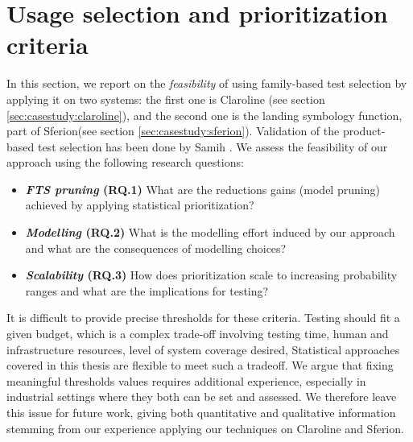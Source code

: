 %


\section{Usage selection and prioritization criteria}

\label{sec:experiment:usage}

In this section,  we report on the \emph{feasibility} of using family-based test selection \cite{Devroey2014,Devroey2015a} by applying it on two systems: the first one is Claroline (see section \ref{sec:casestudy:claroline}), and the second one is the landing symbology function, part of Sferion\texttrademark (see section \ref{sec:casestudy:sferion}). Validation of the product-based test selection has been done by Samih \etal \cite{Samih2014}.
%
We assess the feasibility of our approach using the following research questions:
\begin{itemize}
\item \textbf{\textit{FTS pruning} (RQ.1) } What are the reductions gains (model pruning) achieved by applying statistical  prioritization?    
\item \textbf{\textit{Modelling} (RQ.2) } What is the modelling effort induced by our approach and what are the consequences of modelling choices?
\item \textbf{\textit{Scalability} (RQ.3) } How does prioritization scale to increasing probability ranges and what are the implications for testing?  
\end{itemize}

It is difficult to provide precise thresholds for these criteria. Testing should fit a given budget, which is a complex trade-off involving testing time, human and infrastructure resources, level of system coverage desired, \etc  Statistical approaches covered in this thesis are  flexible to meet such a tradeoff. We argue that fixing meaningful  thresholds values requires additional experience, especially in industrial settings where they both can be set and assessed. We therefore leave this issue for future work, giving both quantitative and qualitative information stemming from our experience applying our techniques on Claroline and Sferion\texttrademark.    


